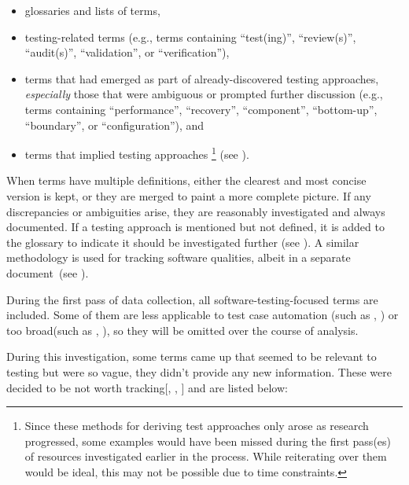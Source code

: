 \begin{itemize}
    \item glossaries and lists of terms,
    \item testing-related terms (e.g., terms containing ``test(ing)'',
          \ifnotpaper ``review(s)'', ``audit(s)'', \fi
          ``validation'', or ``verification''),
    \item terms that had emerged as part of already-discovered
          testing approaches, \emph{especially} those that were ambiguous
          or prompted further discussion (e.g., terms containing
          ``performance'', ``recovery'', ``component'', ``bottom-up'',
          \ifnotpaper ``boundary'', \fi or ``configuration''), and
    \item terms that implied testing approaches%
          \ifnotpaper\footnote{
                  Since these methods for deriving test approaches only arose
                  as research progressed, some examples would have been missed
                  during the first pass(es) of resources investigated earlier
                  in the process. While reiterating over them would be ideal,
                  this may not be possible due to time constraints.
              } (see )\fi.
\end{itemize}

When terms have multiple definitions, either the clearest and most concise
version is kept, or they are merged to paint a more complete picture.
If any discrepancies or ambiguities
arise, they are reasonably investigated and always documented. If a
testing approach is mentioned but not defined, it is added to the
glossary to indicate it should be investigated further (see
). A similar methodology
is used for tracking software qualities, albeit in a separate
document\ifnotpaper\ (see )\fi.

During the first pass of data collection, all software-testing-focused terms
are included. Some of them are less applicable to test case automation
\ifnotpaper(such as , ) \fi or too
broad\ifnotpaper (such as , )\fi, so they
will be omitted over the course of analysis.

\ifnotpaper
    During this investigation, some terms came up that seemed to be relevant to
    testing but were so vague, they didn't provide any new information. These were
    decided to be not worth tracking[, ,
        ] and are listed below:

